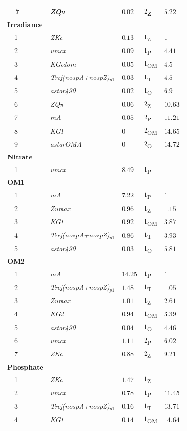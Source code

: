\documentclass[letterpaper,12pt,oneside]{article}\usepackage[]{graphicx}\usepackage[]{color}
\begin{document}
\begin{table}[!tbp]
{\begin{center}
\begin{tabular}{lllll}
~~7&\scriptsize{\textit{ZQn}}&$0.02$&$2$\textsubscript{Z}&$5.22$\tabularnewline
\hline
{\bfseries Irradiance}&&&&\tabularnewline
~~1&\scriptsize{\textit{ZKa}}&$0.13$&$1$\textsubscript{Z}&$1$\tabularnewline
~~2&\scriptsize{\textit{umax}}&$0.09$&$1$\textsubscript{P}&$4.41$\tabularnewline
~~3&\scriptsize{\textit{KGcdom}}&$0.05$&$1$\textsubscript{OM}&$4.5$\tabularnewline
~~4&\scriptsize{\textit{Tref(nospA+nospZ)$_{p1}$}}&$0.03$&$1$\textsubscript{T}&$4.5$\tabularnewline
~~5&\scriptsize{\textit{astar490}}&$0.02$&$1$\textsubscript{O}&$6.9$\tabularnewline
~~6&\scriptsize{\textit{ZQn}}&$0.06$&$2$\textsubscript{Z}&$10.63$\tabularnewline
~~7&\scriptsize{\textit{mA}}&$0.05$&$2$\textsubscript{P}&$11.21$\tabularnewline
~~8&\scriptsize{\textit{KG1}}&$0$&$2$\textsubscript{OM}&$14.65$\tabularnewline
~~9&\scriptsize{\textit{astarOMA}}&$0$&$2$\textsubscript{O}&$14.72$\tabularnewline
\hline
{\bfseries Nitrate}&&&&\tabularnewline
~~1&\scriptsize{\textit{umax}}&$8.49$&$1$\textsubscript{P}&$1$\tabularnewline
\hline
{\bfseries OM1}&&&&\tabularnewline
~~1&\scriptsize{\textit{mA}}&$7.22$&$1$\textsubscript{P}&$1$\tabularnewline
~~2&\scriptsize{\textit{Zumax}}&$0.96$&$1$\textsubscript{Z}&$1.15$\tabularnewline
~~3&\scriptsize{\textit{KG1}}&$0.92$&$1$\textsubscript{OM}&$3.87$\tabularnewline
~~4&\scriptsize{\textit{Tref(nospA+nospZ)$_{p1}$}}&$0.86$&$1$\textsubscript{T}&$3.93$\tabularnewline
~~5&\scriptsize{\textit{astar490}}&$0.03$&$1$\textsubscript{O}&$5.81$\tabularnewline
\hline
{\bfseries OM2}&&&&\tabularnewline
~~1&\scriptsize{\textit{mA}}&$14.25$&$1$\textsubscript{P}&$1$\tabularnewline
~~2&\scriptsize{\textit{Tref(nospA+nospZ)$_{p1}$}}&$1.48$&$1$\textsubscript{T}&$1.05$\tabularnewline
~~3&\scriptsize{\textit{Zumax}}&$1.01$&$1$\textsubscript{Z}&$2.61$\tabularnewline
~~4&\scriptsize{\textit{KG2}}&$0.94$&$1$\textsubscript{OM}&$3.39$\tabularnewline
~~5&\scriptsize{\textit{astar490}}&$0.04$&$1$\textsubscript{O}&$4.46$\tabularnewline
~~6&\scriptsize{\textit{umax}}&$1.11$&$2$\textsubscript{P}&$6.02$\tabularnewline
~~7&\scriptsize{\textit{ZKa}}&$0.88$&$2$\textsubscript{Z}&$9.21$\tabularnewline
\hline
{\bfseries Phosphate}&&&&\tabularnewline
~~1&\scriptsize{\textit{ZKa}}&$1.47$&$1$\textsubscript{Z}&$1$\tabularnewline
~~2&\scriptsize{\textit{umax}}&$0.78$&$1$\textsubscript{P}&$11.45$\tabularnewline
~~3&\scriptsize{\textit{Tref(nospA+nospZ)$_{p1}$}}&$0.16$&$1$\textsubscript{T}&$13.71$\tabularnewline
~~4&\scriptsize{\textit{KG1}}&$0.14$&$1$\textsubscript{OM}&$14.64$\tabularnewline
\hline
\end{tabular}\end{center}}

\end{table}
\end{document}
